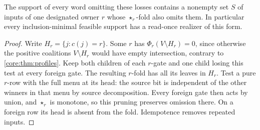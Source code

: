 \begin{lemma}
\label{core:lem:monochromatic-safe-fold}
The support of every word omitting these losses contains a nonempty
set $S$ of inputs of one designated owner $r$ whose $\star_r$-fold
also omits them. In particular every inclusion-minimal feasible
support has a read-once realizer of this form.
\end{lemma}
\begin{proof}
Write $H_r=\{j:c(j)=r\}$. Some $r$ has
$\Phi_r(V\setminus H_r)=0$, since otherwise the positive coalitions
$V\setminus H_r$ would have empty intersection, contrary to
\cref{core:thm:profiles}. Keep both children of each $r$-gate and
one child losing this test at every foreign gate. The resulting
$r$-fold has all its leaves in $H_r$. Test a pure $r$-row with the
full menu at its head: the source bit is independent of the other
winners in that menu by source decomposition. Every foreign gate
then acts by union, and $\star_r$ is monotone, so this pruning
preserves omission there. On a foreign row its head is
absent from the fold. Idempotence removes repeated inputs.
\end{proof}

